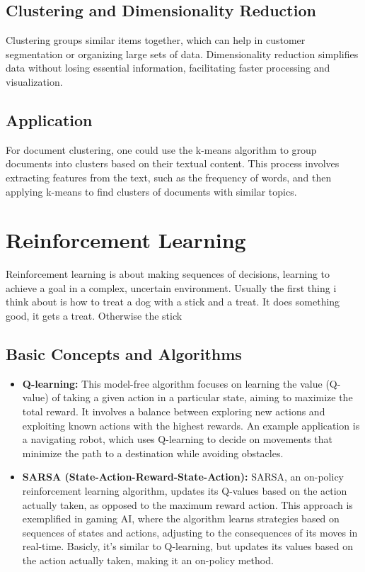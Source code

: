 \documentclass[11pt, a4paper]{article}
\begin{document}
\subsection{Clustering and Dimensionality Reduction}
Clustering groups similar items together, which can help in customer segmentation or organizing large sets of data. Dimensionality reduction simplifies data without losing essential information, facilitating faster processing and visualization.

\subsection{Application}
For document clustering, one could use the k-means algorithm to group documents into clusters based on their textual content. This process involves extracting features from the text, such as the frequency of words, and then applying k-means to find clusters of documents with similar topics.

\section{Reinforcement Learning}
Reinforcement learning is about making sequences of decisions, learning to achieve a goal in a complex, uncertain environment. Usually the first thing i think about is how to treat a dog with a stick and a treat. It does something good, it gets a treat. Otherwise the stick

\subsection{Basic Concepts and Algorithms}
\begin{itemize}
    \item \textbf{Q-learning:} This model-free algorithm focuses on learning the value (Q-value) of taking a given action in a particular state, aiming to maximize the total reward. It involves a balance between exploring new actions and exploiting known actions with the highest rewards. An example application is a navigating robot, which uses Q-learning to decide on movements that minimize the path to a destination while avoiding obstacles.
    \item \textbf{SARSA (State-Action-Reward-State-Action):} SARSA, an on-policy reinforcement learning algorithm, updates its Q-values based on the action actually taken, as opposed to the maximum reward action. This approach is exemplified in gaming AI, where the algorithm learns strategies based on sequences of states and actions, adjusting to the consequences of its moves in real-time. Basicly, it's similar to Q-learning, but updates its values based on the action actually taken, making it an on-policy method.
    
\end{itemize}
\end{document}

